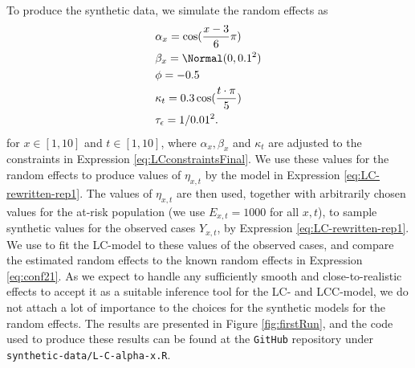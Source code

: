 \newpar To produce the synthetic data, we simulate the random effects as
\begin{equation}
    \begin{aligned}
    &\alpha_x = \cos(\frac{x-3}{6}\pi)\\
    &\beta_x = \Normal(0,0.1^2)\\
    &\phi = -0.5\\
    &\kappa_t = 0.3\cos(\frac{t\cdot \pi}{5})\\
    &\tau_{\epsilon} = 1/0.01^2.
    \end{aligned}
    \label{eq:conf21}
\end{equation}
for $x\in [1,10]$ and $t \in [1,10]$, where $\alpha_x, \beta_x$ and $\kappa_t$ are adjusted to the constraints in Expression \ref{eq:LCconstraintsFinal}. We use these values for the random effects to produce values of $\eta_{x,t}$ by the model in Expression \ref{eq:LC-rewritten-rep1}. The values of $\eta_{x,t}$ are then used, together with arbitrarily chosen values for the at-risk population (we use $E_{x,t} = 1000$ for all $x,t$), to sample synthetic values for the observed cases $Y_{x,t}$, by Expression \ref{eq:LC-rewritten-rep1}. We use \inlabru to fit the LC-model to these values of the observed cases, and compare the estimated random effects to the known random effects in Expression \ref{eq:conf21}. As we expect \inlabru to handle any sufficiently smooth and close-to-realistic effects to accept it as a suitable inference tool for the LC- and LCC-model, we do not attach a lot of importance to the choices for the synthetic models for the random effects. The results are presented in Figure \ref{fig:firstRun}, and the code used to produce these results can be found at the \texttt{GitHub} repository under \texttt{synthetic-data/L-C-alpha-x.R}.


